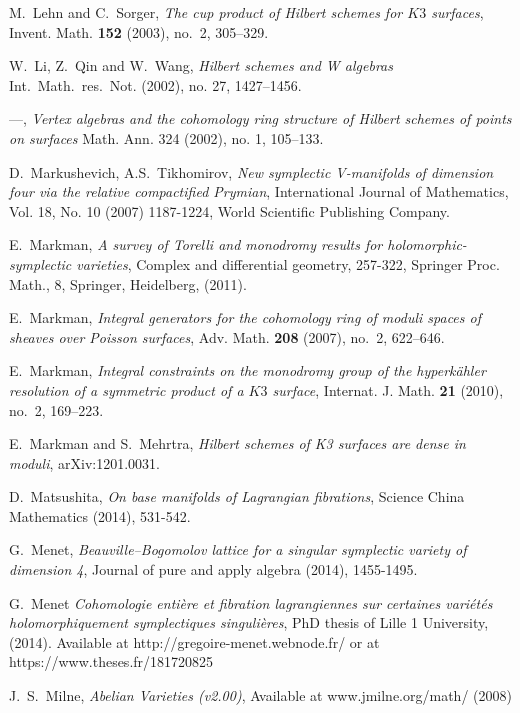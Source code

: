 \begin{thebibliography}{10}
M.~Lehn and C.~Sorger, \emph{The cup product of Hilbert schemes for {$K3$}
  surfaces}, Invent. Math. \textbf{152} (2003), no.~2, 305--329.

W.~Li, Z.~Qin and W.~Wang, \emph{Hilbert schemes and W algebras} Int.~Math.~res.~Not. (2002),
  no. 27, 1427--1456.

---, \emph{Vertex algebras and the cohomology ring structure of 
  Hilbert schemes of points on surfaces} Math. Ann. 324 (2002), no. 1, 105--133.  
  
D.~Markushevich, A.S.~Tikhomirov,
\emph{ New symplectic V-manifolds of dimension four via the relative compactified Prymian},
International Journal of Mathematics, Vol. 18, No. 10 (2007) 1187-1224,
World Scientific Publishing Company.  
  
E.~Markman,
\emph{ A survey of Torelli and monodromy results for holomorphic-symplectic varieties},
Complex and differential geometry,
257-322, Springer Proc. Math., 8, Springer, Heidelberg, (2011).  
  
E.~Markman, \emph{Integral generators for the cohomology ring of moduli spaces of
  sheaves over Poisson surfaces}, Adv. Math. \textbf{208} (2007), no.~2,
  622--646.

E.~Markman, \emph{Integral constraints on the monodromy group of the
  hyperk\"ahler resolution of a symmetric product of a {$K3$} surface},
  Internat. J. Math. \textbf{21} (2010), no.~2, 169--223.

E.~Markman and S.~Mehrtra,
\emph{Hilbert schemes of K3 surfaces are dense in moduli},
arXiv:1201.0031.

D.~Matsushita,
\emph{On base manifolds of Lagrangian fibrations},
Science China Mathematics (2014), 531-542.

G.~Menet,
\emph{Beauville--Bogomolov lattice for a singular symplectic variety of dimension 4},
Journal of pure and apply algebra (2014), 1455-1495.

G.~Menet
\emph{Cohomologie enti\`ere et fibration lagrangiennes sur certaines vari\'et\'es holomorphiquement symplectiques singuli\`eres},
PhD thesis of Lille 1 University, (2014). Available at http://gregoire-menet.webnode.fr/ or at https://www.theses.fr/181720825

J.~S.~Milne, \emph{Abelian Varieties (v2.00)}, Available at www.jmilne.org/math/ (2008)  


\end{thebibliography}
